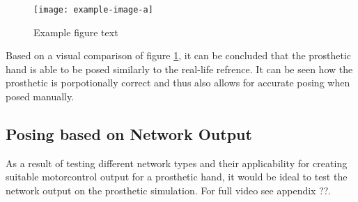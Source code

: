\documentclass[../main.tex]{subfiles}
\begin{document}
\begin{figure}[h]
\begin{center}
\texttt{[image: example-image-a]}
\caption{Example figure text}
\label{fig:hand_pose_test}
\end{center}
\end{figure}


Based on a visual comparison of figure \ref{fig:hand_pose_test}, it can be concluded that the prosthetic hand is able to be posed similarly to the real-life refrence.
It can be seen how the prosthetic is porpotionally correct and thus also allows for accurate posing when posed manually.

\subsection{Posing based on Network Output}

As a result of testing different network types and their applicability for creating suitable motorcontrol output for a prosthetic hand, it would be ideal to test the network output on the prosthetic simulation.
For full video see appendix ??.





\end{document}
